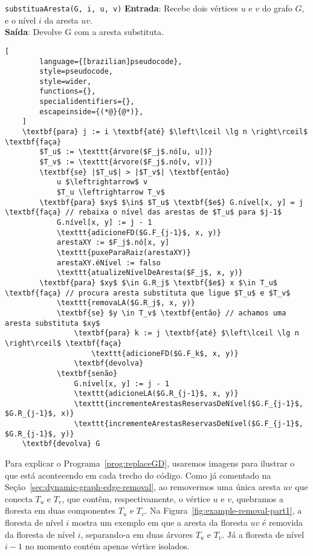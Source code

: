 \begin{programruledcaption}{\texttt{substituaAresta(G, i, u, v)} \label{prog:replaceGD}}
    \noindent\textbf{Entrada}: Recebe dois vértices $u$ e $v$ do grafo $G$, e o nível $i$ da aresta $uv$. \\
    \noindent\textbf{Saída}: Devolve G com a aresta substituta.
    
    \vspace{-0.5\baselineskip}
    \begin{lstlisting}[
        language={[brazilian]pseudocode},
        style=pseudocode,
        style=wider,
        functions={},
        specialidentifiers={},
        escapeinside={(*@}{@*)},
    ]
    \textbf{para} j := i \textbf{até} $\left\lceil \lg n \right\rceil$ \textbf{faça}
        $T_u$ := \texttt{árvore($F_j$.nó[u, u])}
        $T_v$ := \texttt{árvore($F_j$.nó[v, v])}    
        \textbf{se} |$T_u$| > |$T_v$| \textbf{então}
            u $\leftrightarrow$ v
            $T_u \leftrightarrow T_v$
        \textbf{para} $xy$ $\in$ $T_u$ \textbf{$e$} G.nível[x, y] = j \textbf{faça} // rebaixa o nível das arestas de $T_u$ para $j-1$
            G.nível[x, y] := j - 1
            \texttt{adicioneFD($G.F_{j-1}$, x, y)}
            arestaXY := $F_j$.nó[x, y]
            \texttt{puxeParaRaiz(arestaXY)}
            arestaXY.éNível := falso
            \texttt{atualizeNívelDeAresta($F_j$, x, y)}
        \textbf{para} $xy$ $\in G.R_j$ \textbf{$e$} x $\in T_u$ \textbf{faça} // procura aresta substituta que ligue $T_u$ e $T_v$
            \texttt{removaLA($G.R_j$, x, y)} 
            \textbf{se} $y \in T_v$ \textbf{então} // achamos uma aresta substituta $xy$
                \textbf{para} k := j \textbf{até} $\left\lceil \lg n \right\rceil$ \textbf{faça}
                    \texttt{adicioneFD($G.F_k$, x, y)}
                \textbf{devolva}
            \textbf{senão}
                G.nível[x, y] := j - 1
                \texttt{adicioneLA($G.R_{j-1}$, x, y)}
                \texttt{incrementeArestasReservasDeNível($G.F_{j-1}$, $G.R_{j-1}$, x)}
                \texttt{incrementeArestasReservasDeNível($G.F_{j-1}$, $G.R_{j-1}$, y)}
    \textbf{devolva} G
    \end{lstlisting}
    \vspace{-0.5\baselineskip}
\end{programruledcaption}

Para explicar o Programa~\ref{prog:replaceGD}, usaremos imagens para ilustrar o que está acontecendo em cada trecho do código. Como já comentado na Seção~\ref{sec:dynamic-graph-edge-removal}, ao removermos uma única aresta $uv$ que conecta $T_u$ e $T_v$, que contêm, respectivamente, o vértice $u$ e $v$, quebramos a floresta em duas componentes $T_u$ e $T_v$. Na Figura~\ref{fig:example-removal-part1}, a floresta de nível $i$ mostra um exemplo em que a aresta da floresta $uv$ é removida da floresta de nível $i$, separando-a em duas árvores $T_u$ e $T_v$. Já a floresta de nível $i-1$ no momento contém apenas vértice isolados.

